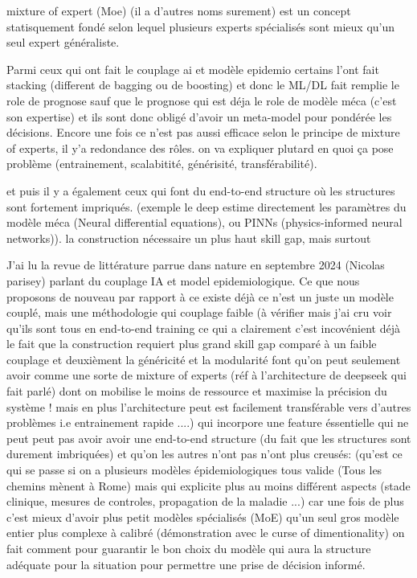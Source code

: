 mixture of expert (Moe) (il a d'autres noms surement) est un concept statisquement fondé selon lequel plusieurs experts spécialisés  sont mieux qu'un seul expert généraliste.

Parmi ceux qui ont fait le couplage ai et modèle epidemio certains l'ont fait stacking (different de bagging ou de boosting) et donc le ML/DL fait remplie le role de prognose sauf que le prognose qui est déja le role de modèle méca (c'est son expertise) et ils sont donc obligé d'avoir un meta-model pour pondérée les décisions. Encore une fois ce n'est pas aussi efficace selon le principe de mixture of experts, il y'a redondance des rôles. on va expliquer plutard en quoi ça pose problème (entrainement, scalabitité, générisité, transférabilité).

et puis il y a également ceux qui font du end-to-end structure où les structures sont fortement impriqués. (exemple le deep estime directement les paramètres du modèle méca (Neural differential equations), ou PINNs (physics-informed neural networks)). la construction nécessaire un plus haut skill gap, mais surtout  


J'ai lu la revue de littérature parrue dans nature en septembre 2024 (Nicolas parisey) parlant du couplage IA et model epidemiologique. Ce que nous proposons de nouveau par rapport à ce existe déjà ce n'est un juste un modèle couplé, mais une méthodologie qui couplage faible (à vérifier mais j'ai cru voir qu'ils sont tous en end-to-end training  ce qui a clairement c'est incovénient déjà le fait que la construction requiert plus grand skill gap comparé à un faible couplage et deuxièment la généricité et la modularité font qu'on peut seulement avoir comme une sorte de mixture of experts (réf à l'architecture de deepseek qui fait parlé) dont on mobilise le moins de ressource et maximise la précision du système ! mais en plus l'architecture peut est facilement transférable vers d'autres problèmes i.e entrainement rapide ....) qui incorpore une feature éssentielle qui ne peut peut pas avoir avoir une end-to-end structure (du fait que les structures sont durement imbriquées) et qu'on les autres n'ont pas n'ont plus creusés: (qu'est ce qui se passe si on a plusieurs modèles épidemiologiques tous valide (Tous les chemins mènent à Rome) mais qui explicite plus au moins différent aspects (stade clinique, mesures de controles, propagation de la maladie ...) car une fois de plus c'est mieux d'avoir plus petit modèles spécialisés (MoE) qu'un seul gros modèle entier plus complexe à calibré (démonstration avec le curse of dimentionality) on fait comment pour guarantir le bon choix du modèle qui aura la structure adéquate pour la situation pour permettre une prise de décision informé.


